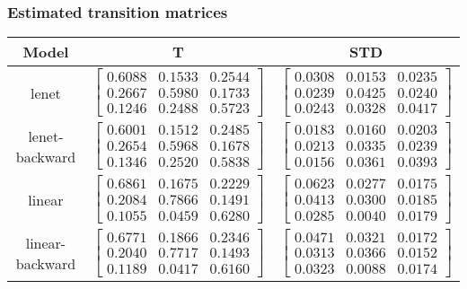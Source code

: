 \documentclass{article} %
\begin{document}
\subsubsection{Estimated transition matrices}
\begin{table}\begin{tabular}{ccc}Model&T&STD\\\hline
lenet & $\begin{bmatrix}0.6088 & 0.1533 & 0.2544\\0.2667 & 0.5980 & 0.1733\\0.1246 & 0.2488 & 0.5723\end{bmatrix}$ & $\begin{bmatrix}0.0308 & 0.0153 & 0.0235\\0.0239 & 0.0425 & 0.0240\\0.0243 & 0.0328 & 0.0417\end{bmatrix}$\\
lenet-backward & $\begin{bmatrix}0.6001 & 0.1512 & 0.2485\\0.2654 & 0.5968 & 0.1678\\0.1346 & 0.2520 & 0.5838\end{bmatrix}$ & $\begin{bmatrix}0.0183 & 0.0160 & 0.0203\\0.0213 & 0.0335 & 0.0239\\0.0156 & 0.0361 & 0.0393\end{bmatrix}$\\
linear & $\begin{bmatrix}0.6861 & 0.1675 & 0.2229\\0.2084 & 0.7866 & 0.1491\\0.1055 & 0.0459 & 0.6280\end{bmatrix}$ & $\begin{bmatrix}0.0623 & 0.0277 & 0.0175\\0.0413 & 0.0300 & 0.0185\\0.0285 & 0.0040 & 0.0179\end{bmatrix}$\\
linear-backward & $\begin{bmatrix}0.6771 & 0.1866 & 0.2346\\0.2040 & 0.7717 & 0.1493\\0.1189 & 0.0417 & 0.6160\end{bmatrix}$ & $\begin{bmatrix}0.0471 & 0.0321 & 0.0172\\0.0313 & 0.0366 & 0.0152\\0.0323 & 0.0088 & 0.0174\end{bmatrix}$\\

\end{tabular}
\end{table}
\end{document}
